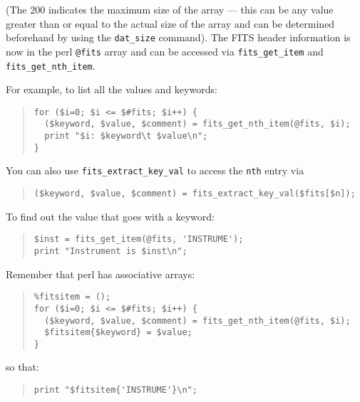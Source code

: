 \documentclass[twoside,11pt]{article}
\newenvironment{myquote}{\begin{quote}\begin{small}}{\end{small}\end{quote}}
\begin{document}
(The 200 indicates the maximum size of the array --- this can be any
value greater than or equal to the actual size of the array and can be
determined beforehand by using the \texttt{dat\_size} command).  The FITS
header information is now in the perl \texttt{@fits} array and can be accessed
via \texttt{fits\_get\_item} and \texttt{fits\_get\_nth\_item}.

For example, to list all the values and keywords:

\begin{myquote}
\begin{verbatim}
for ($i=0; $i <= $#fits; $i++) {
  ($keyword, $value, $comment) = fits_get_nth_item(@fits, $i);
  print "$i: $keyword\t $value\n";
}
\end{verbatim}
\end{myquote}

You can also use \texttt{fits\_extract\_key\_val} to
access the \texttt{nth} entry via

\begin{myquote}
\begin{verbatim}
($keyword, $value, $comment) = fits_extract_key_val($fits[$n]);
\end{verbatim}
\end{myquote}

To find out the value that goes with a keyword:

\begin{myquote}
\begin{verbatim}
$inst = fits_get_item(@fits, 'INSTRUME');
print "Instrument is $inst\n";
\end{verbatim}
\end{myquote}

Remember that perl has associative arrays:

\begin{myquote}
\begin{verbatim}
%fitsitem = ();
for ($i=0; $i <= $#fits; $i++) {
  ($keyword, $value, $comment) = fits_get_nth_item(@fits, $i);
  $fitsitem{$keyword} = $value;
}
\end{verbatim}
\end{myquote}

so that:

\begin{myquote}
\begin{verbatim}
print "$fitsitem{'INSTRUME'}\n";
\end{verbatim}
\end{myquote}
\end{document}
